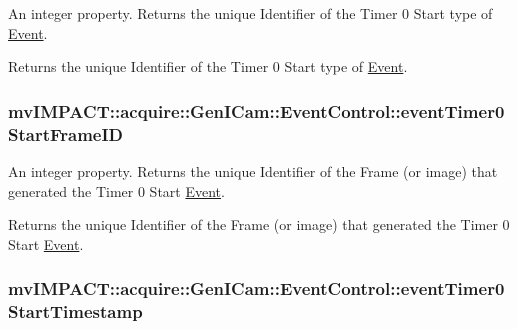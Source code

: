 An integer property. Returns the unique Identifier of the Timer 0 Start type of \hyperlink{classmv_i_m_p_a_c_t_1_1acquire_1_1_event}{Event}. 

Returns the unique Identifier of the Timer 0 Start type of \hyperlink{classmv_i_m_p_a_c_t_1_1acquire_1_1_event}{Event}. \hypertarget{classmv_i_m_p_a_c_t_1_1acquire_1_1_gen_i_cam_1_1_event_control_a29a2c994186a13f73c14eca7afbb29e7}{
\subsubsection[{event\+Timer0\+Start\+Frame\+I\+D}]{ mv\+I\+M\+P\+A\+C\+T\+::acquire\+::\+Gen\+I\+Cam\+::\+Event\+Control\+::event\+Timer0\+Start\+Frame\+I\+D}}\label{classmv_i_m_p_a_c_t_1_1acquire_1_1_gen_i_cam_1_1_event_control_a29a2c994186a13f73c14eca7afbb29e7}


An integer property. Returns the unique Identifier of the Frame (or image) that generated the Timer 0 Start \hyperlink{classmv_i_m_p_a_c_t_1_1acquire_1_1_event}{Event}. 

Returns the unique Identifier of the Frame (or image) that generated the Timer 0 Start \hyperlink{classmv_i_m_p_a_c_t_1_1acquire_1_1_event}{Event}. \hypertarget{classmv_i_m_p_a_c_t_1_1acquire_1_1_gen_i_cam_1_1_event_control_a8defe8a913269878fd3340dbfb4fa9c4}{
\subsubsection[{event\+Timer0\+Start\+Timestamp}]{ mv\+I\+M\+P\+A\+C\+T\+::acquire\+::\+Gen\+I\+Cam\+::\+Event\+Control\+::event\+Timer0\+Start\+Timestamp}}\label{classmv_i_m_p_a_c_t_1_1acquire_1_1_gen_i_cam_1_1_event_control_a8defe8a913269878fd3340dbfb4fa9c4}


